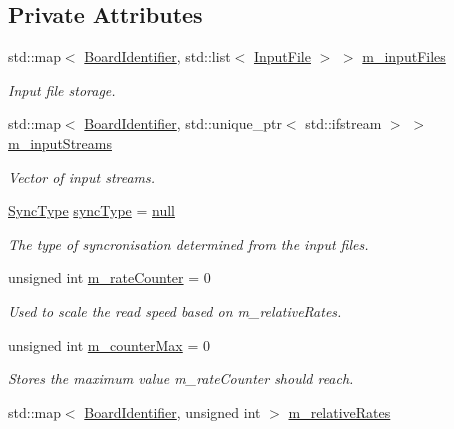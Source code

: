 \subsection*{Private Attributes}
\begin{DoxyCompactItemize}
\item 
std\+::map$<$ \hyperlink{class_board_identifier}{Board\+Identifier}, std\+::list$<$ \hyperlink{class_input_file}{Input\+File} $>$ $>$ \hyperlink{class_file_reader_a1b30d4ef75ca8de90c7271bc39ae320b}{m\+\_\+input\+Files}
\begin{DoxyCompactList}\small\item\em Input file storage. \end{DoxyCompactList}\item 
std\+::map$<$ \hyperlink{class_board_identifier}{Board\+Identifier}, std\+::unique\+\_\+ptr$<$ std\+::ifstream $>$ $>$ \hyperlink{class_file_reader_ad24e41220e68e1857fdef7df35c1d2da}{m\+\_\+input\+Streams}
\begin{DoxyCompactList}\small\item\em Vector of input streams. \end{DoxyCompactList}\item 
\hyperlink{class_file_reader_aa591258dbf3366cfd674e84a1f2f6531}{Sync\+Type} \hyperlink{class_file_reader_aace1373e21949925dbfe568e4c8d7f56}{sync\+Type} = \hyperlink{class_file_reader_aa591258dbf3366cfd674e84a1f2f6531a3d35358ce57d04ec9c0e07af48692c88}{null}
\begin{DoxyCompactList}\small\item\em The type of syncronisation determined from the input files. \end{DoxyCompactList}\item 
unsigned int \hyperlink{class_file_reader_a2e6b51dae972af878f7751f2b6a54d75}{m\+\_\+rate\+Counter} = 0
\begin{DoxyCompactList}\small\item\em Used to scale the read speed based on m\+\_\+relative\+Rates. \end{DoxyCompactList}\item 
unsigned int \hyperlink{class_file_reader_a7e3ce1501c6bd018d818aab3bfa18cdb}{m\+\_\+counter\+Max} = 0
\begin{DoxyCompactList}\small\item\em Stores the maximum value m\+\_\+rate\+Counter should reach. \end{DoxyCompactList}\item 
std\+::map$<$ \hyperlink{class_board_identifier}{Board\+Identifier}, unsigned int $>$ \hyperlink{class_file_reader_ab00c6ff706d8cee9ee064f9cc3258d08}{m\+\_\+relative\+Rates}

\end{DoxyCompactItemize}
